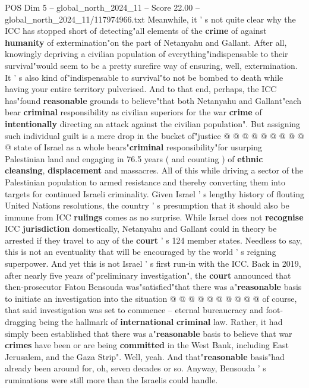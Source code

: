 \begin{textsample}{POS Dim 5 – global\_north\_2024\_11 – Score 22.00 – global\_north\_2024\_11/117974966.txt}
Meanwhile, it ' s not quite clear why the ICC has stopped short of detecting"all elements of the \textbf{crime} of against \textbf{humanity} of extermination"on the part of Netanyahu and Gallant.
After all, knowingly depriving a civilian population of everything"indispensable to their survival"would seem to be a pretty surefire way of ensuring, well, extermination.
It ' s also kind of"indispensable to survival"to not be bombed to death while having your entire territory pulverised.
And to that end, perhaps, the ICC has"found \textbf{reasonable} grounds to believe"that both Netanyahu and Gallant"each bear \textbf{criminal} responsibility as civilian superiors for the war \textbf{crime} of \textbf{intentionally} directing an attack against the civilian population".
But assigning such individual guilt is a mere drop in the bucket of"justice @ @ @ @ @ @ @ @ @ @ state of Israel as a whole bears"\textbf{criminal} responsibility"for usurping Palestinian land and engaging in 76.5 years ( and counting ) of \textbf{ethnic} \textbf{cleansing}, \textbf{displacement} and massacres.
All of this while driving a sector of the Palestinian population to armed resistance and thereby converting them into targets for continued Israeli criminality.
Given Israel ' s lengthy history of flouting United Nations resolutions, the country ' s presumption that it should also be immune from ICC \textbf{rulings} comes as no surprise.
While Israel does not \textbf{recognise} ICC \textbf{jurisdiction} domestically, Netanyahu and Gallant could in theory be arrested if they travel to any of the \textbf{court} ' s 124 member states.
Needless to say, this is not an eventuality that will be encouraged by the world ' s reigning superpower.
And yet this is not Israel ' s first run-in with the ICC.
Back in 2019, after nearly five years of"preliminary investigation", the \textbf{court} announced that then-prosecutor Fatou Bensouda was"satisfied"that there was a"\textbf{reasonable} basis to initiate an investigation into the situation @ @ @ @ @ @ @ @ @ @ of course, that said investigation was set to commence -- eternal bureaucracy and foot-dragging being the hallmark of \textbf{international} \textbf{criminal} law.
Rather, it had simply been established that there was a"\textbf{reasonable} basis to believe that war \textbf{crimes} have been or are being \textbf{committed} in the West Bank, including East Jerusalem, and the Gaza Strip".
Well, yeah.
And that"\textbf{reasonable} basis"had already been around for, oh, seven decades or so.
Anyway, Bensouda ' s ruminations were still more than the Israelis could handle.

\end{textsample}
